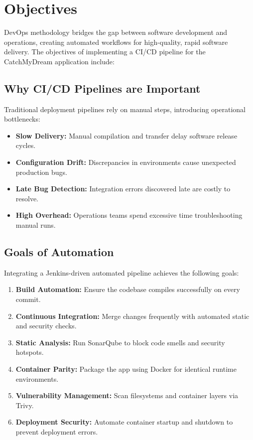 \documentclass[12pt,a4paper]{article}
\begin{document}
\section{Objectives}

DevOps methodology bridges the gap between software development and operations, creating automated workflows for high-quality, rapid software delivery. The objectives of implementing a CI/CD pipeline for the CatchMyDream application include:

\subsection{Why CI/CD Pipelines are Important}
Traditional deployment pipelines rely on manual steps, introducing operational bottlenecks:
\begin{itemize}[noitemsep, topsep=1pt, parsep=0pt, partopsep=0pt, leftmargin=*]
    \item \textbf{Slow Delivery:} Manual compilation and transfer delay software release cycles.
    \item \textbf{Configuration Drift:} Discrepancies in environments cause unexpected production bugs.
    \item \textbf{Late Bug Detection:} Integration errors discovered late are costly to resolve.
    \item \textbf{High Overhead:} Operations teams spend excessive time troubleshooting manual runs.
\end{itemize}

\subsection{Goals of Automation}
Integrating a Jenkins-driven automated pipeline achieves the following goals:
\begin{enumerate}[noitemsep, topsep=1pt, parsep=0pt, partopsep=0pt, leftmargin=*]
    \item \textbf{Build Automation:} Ensure the codebase compiles successfully on every commit.
    \item \textbf{Continuous Integration:} Merge changes frequently with automated static and security checks.
    \item \textbf{Static Analysis:} Run SonarQube to block code smells and security hotspots.
    \item \textbf{Container Parity:} Package the app using Docker for identical runtime environments.
    \item \textbf{Vulnerability Management:} Scan filesystems and container layers via Trivy.
    \item \textbf{Deployment Security:} Automate container startup and shutdown to prevent deployment errors.
\end{enumerate}
\end{document}
